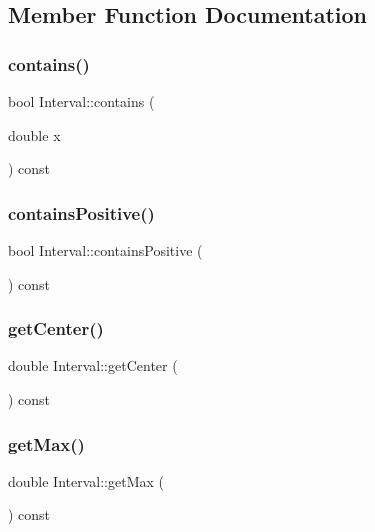 \subsection{Member Function Documentation}
\mbox{\label{classInterval_a303cb6f65a8e98d64fa0bb88cc03ed50}} 
\subsubsection{\texorpdfstring{contains()}{contains()}}
{\footnotesize\ttfamily bool Interval\+::contains (\begin{DoxyParamCaption}\item[{double}]{x }\end{DoxyParamCaption}) const}

\mbox{\label{classInterval_a779a20722679c08c08f720a0fe3231fe}} 
\subsubsection{\texorpdfstring{containsPositive()}{containsPositive()}}
{\footnotesize\ttfamily bool Interval\+::contains\+Positive (\begin{DoxyParamCaption}{ }\end{DoxyParamCaption}) const}

\mbox{\label{classInterval_a64e3d5481f199c38ef5e316da0617b30}} 
\subsubsection{\texorpdfstring{getCenter()}{getCenter()}}
{\footnotesize\ttfamily double Interval\+::get\+Center (\begin{DoxyParamCaption}{ }\end{DoxyParamCaption}) const}

\mbox{\label{classInterval_a9a7833a07e551193309a13271c6e18ff}} 
\subsubsection{\texorpdfstring{getMax()}{getMax()}}
{\footnotesize\ttfamily double Interval\+::get\+Max (\begin{DoxyParamCaption}{ }\end{DoxyParamCaption}) const}

